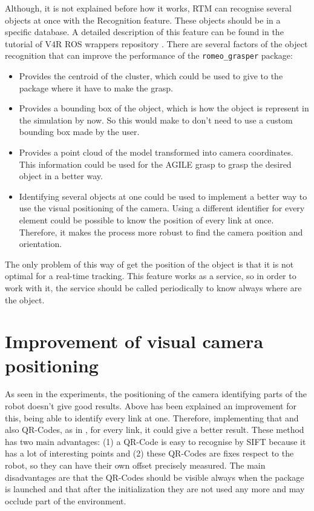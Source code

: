 \documentclass[12pt,a4paper,final,twoside,openright]{report}
\begin{document}
Although, it is not explained before how it works, RTM can recognise several objects at once with the Recognition feature. These objects should be in a specific database. A detailed description of this feature can be found in the tutorial of V4R ROS wrappers repository \cite{gitV4RWrappers}. There are several factors of the object recognition that can improve the performance of the \texttt{romeo\_grasper} package:

\begin{itemize}
\item Provides the centroid of the cluster, which could be used to give to the package where it have to make the grasp.
\item Provides a bounding box of the object, which is how the object is represent in the simulation by now. So this would make to don't need to use a custom bounding box made by the user.
\item Provides a point cloud of the model transformed into camera coordinates. This information could be used for the AGILE grasp to grasp the desired object in a better way.
\item Identifying several objects at one could be used to implement a better way to use the visual positioning of the camera. Using a different identifier for every element could be possible to know the position of every link at once. Therefore, it makes the process more robust to find the camera position and orientation. 
\end{itemize}

The only problem of this way of get the position of the object is that it is not optimal for a real-time tracking. This feature works as a service, so in order to work with it, the service should be called periodically to know always where are the object.

\section{Improvement of visual camera positioning}

As seen in the experiments, the positioning of the camera identifying parts of the robot doesn't give good results. Above has been explained an improvement for this, being able to identify every link at one. Therefore, implementing that and also QR-Codes, as in \cite{claudio:hal-01159882}, for every link, it could give a better result. These method has two main advantages: (1) a QR-Code is easy to recognise by SIFT because it has a lot of interesting points and (2) these QR-Codes are fixes respect to the robot, so they can have their own offset precisely measured. The main disadvantages are that the QR-Codes should be visible always when the package is launched and that after the initialization they are not used any more and may occlude part of the environment.
\end{document}
